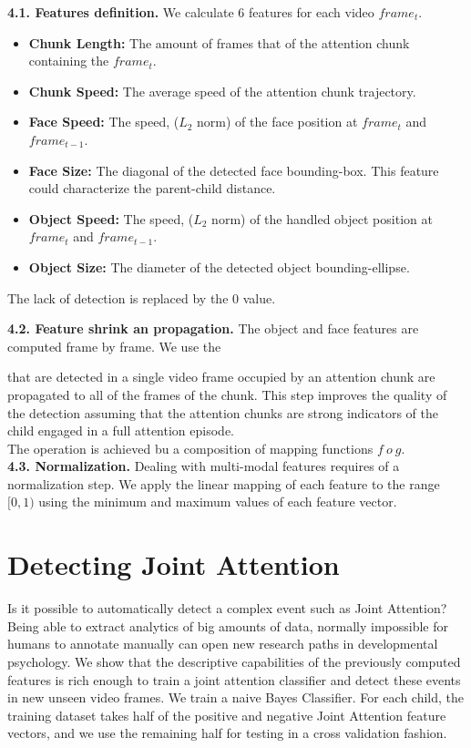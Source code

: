 \documentclass[10pt,letterpaper]{article}
\begin{document}
{\bf 4.1. Features definition.} We calculate 6 features for each video $frame_{t}$. 
\begin {itemize}
\item {\bf Chunk Length:} The amount of frames that of the attention chunk containing the $frame_{t}$.
\vspace {-0.2cm}
\item {\bf Chunk Speed:} The average speed of the attention chunk trajectory. 
\vspace {-0.2cm}
\item {\bf Face Speed:} The speed, ($L_{2}$ norm) of the face position at $frame_{t}$ and $frame_{t-1}$.    
\vspace {-0.2cm}
\item {\bf Face Size:} The diagonal of the detected face bounding-box. This feature could characterize the parent-child distance.   
\vspace {-0.2cm}
\item {\bf Object Speed:} The speed, ($L_{2}$ norm) of the handled object position at $frame_{t}$ and $frame_{t-1}$.    
\vspace {-0.2cm}
\item {\bf Object Size:} The diameter of the detected object bounding-ellipse.
\end{itemize}
The lack of detection is replaced by the 0 value. 

{\bf 4.2. Feature shrink an propagation.} The object and face features are computed frame by frame. We use the 

 that are detected in a single video frame occupied by an attention chunk are propagated to all of the frames of the chunk. This step improves the quality of the detection assuming that the attention chunks are strong indicators of the child engaged in a full attention episode.\\ The operation is achieved bu a composition of mapping functions $f ~o~ g$. \\


{\bf 4.3. Normalization.} Dealing with multi-modal features requires of a normalization step. We apply the linear mapping of each feature to the range $[0,1)$ using the minimum and maximum values of each feature vector.\\

\section{Detecting Joint Attention}
Is it possible to automatically detect a complex event such as Joint Attention? Being able to extract analytics of big amounts of data, normally impossible for humans to annotate manually can open new research paths in developmental psychology. We show that the descriptive capabilities of the previously computed features is rich enough to train a joint attention classifier and detect these events in new unseen video frames. We train a naive Bayes Classifier. For each child, the training dataset takes half of the positive and negative Joint Attention feature vectors, and we use the remaining half for testing in a cross validation fashion. 
 
\end{document}
